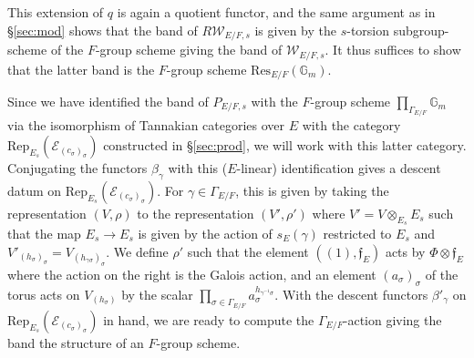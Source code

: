\documentclass[11pt]{amsart}
\theoremstyle{definition}
\newcommand{\mc}{\mathcal}
\newcommand{\mf}{\mathfrak}
\begin{document}
This extension of $q$ is again a quotient functor, and the same argument as in \S \ref{sec:mod} shows that the band of $R\mc{W}_{E/F,s}$ is given by the $s$-torsion subgroup-scheme of the $F$-group scheme giving the band of $\mc{W}_{E/F,s}$. It thus suffices to show that the latter band is the $F$-group scheme $\text{Res}_{E/F}(\mathbb{G}_{m})$.

Since we have identified the band of $P_{E/F,s}$ with the $F$-group scheme $\prod_{\Gamma_{E/F}} \mathbb{G}_{m}$ via the isomorphism of Tannakian categories over $E$ with the category $\text{Rep}_{E_{s}}(\mc{E}_{(c_{\sigma})_{\sigma}})$ constructed in \S \ref{sec:prod}, we will work with this latter category. Conjugating the functors $\beta_{\gamma}$ with this ($E$-linear) identification gives a descent datum on $\text{Rep}_{E_{s}}(\mc{E}_{(c_{\sigma})_{\sigma}})$. For $\gamma \in \Gamma_{E/F}$, this is given by taking the representation $(V, \rho)$ to the representation $(V', \rho')$ where $V'=V \otimes_{E_s} E_s$ such that the map $E_s \to E_s$ is given by the action of $s_{E}(\gamma)$ restricted to $E_{s}$ and $V'_{(h_{\sigma})_{\sigma}} = V_{(h_{\gamma \sigma})_{\sigma}}$. We define $\rho'$ such that the element $((1),\mf{f}_{E})$ acts by $\Phi \otimes \mf{f}_E$ where the action on the right is the Galois action, and an element $(a_{\sigma})_{\sigma}$ of the torus acts on $V_{(h_{\sigma})}$ by the scalar $\prod_{\sigma \in \Gamma_{E/F}} a_{\sigma}^{h_{\gamma^{-1}\sigma}}$. With the descent functors $\beta'_{\gamma}$ on $\text{Rep}_{E_{s}}(\mc{E}_{(c_{\sigma})_{\sigma}})$ in hand, we are ready to compute the $\Gamma_{E/F}$-action giving the band the structure of an $F$-group scheme. 
\end{document}
